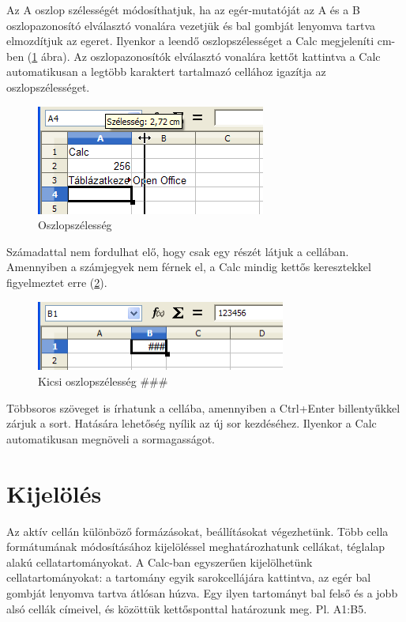 Az A oszlop szélességét módosíthatjuk, ha az
egér-mutatóját az A és a B oszlopazonosító elválasztó
vonalára vezetjük és bal gombját lenyomva tartva elmozdítjuk
az egeret. Ilyenkor a leendő oszlopszélességet a Calc
megjeleníti cm-ben (\ref{Oszlopszélesség} ábra). Az oszlopazonosítók
 elválasztó vonalára kettőt kattintva a Calc automatikusan a
legtöbb karaktert tartalmazó cellához igazítja az
oszlopszélességet.

\begin{figure}[!h]
\begin{center}
\includegraphics[width=7.539cm]{oocalcv1-img7.png}
\caption{Oszlopszélesség}\label{Oszlopszélesség}
\end{center}
\end{figure}

Számadattal nem fordulhat elő, hogy csak egy részét látjuk a
cellában. Amennyiben a számjegyek nem férnek el, a Calc mindig
kettős keresztekkel figyelmeztet erre (\ref{KeskenyOszlop}).

\begin{figure}[!h]
\begin{center}
\includegraphics[width=8.2cm]{oocalcv1-img8.png}
\caption{Kicsi oszlopszélesség \#\#\#}\label{KeskenyOszlop}
\end{center}
\end{figure}

Többsoros szöveget is írhatunk a cellába, amennyiben a
Ctrl+Enter billentyűkkel zárjuk a sort. Hatására
lehetőség nyílik az új sor kezdéséhez. Ilyenkor a Calc
automatikusan megnöveli a sormagasságot.


\section{Kijelölés}

Az aktív cellán különböző formázásokat,
beállításokat végezhetünk. Több cella formátumának
 módosításához kijelöléssel meghatározhatunk cellákat,
téglalap alakú cellatartományokat. A Calc-ban egyszerűen
kijelölhetünk cellatartományokat: a tartomány egyik
sarokcellájára kattintva, az egér bal gombját lenyomva tartva
átlósan húzva. Egy ilyen tartományt bal felső és a jobb
alsó cellák címeivel, és közöttük kettősponttal
határozunk meg. Pl. A1:B5.

